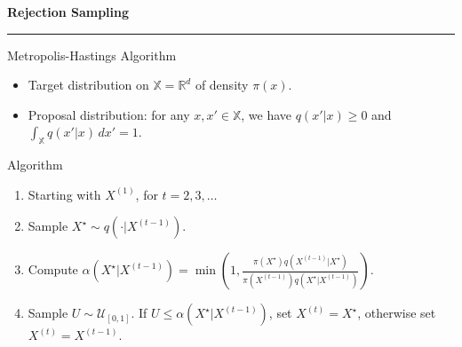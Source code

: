 
% 

\begin{frame}
	\vspace{2cm}
	\begin{center}
		{\Huge\textbf{\textcolor{copenhagenred}{Rejection Sampling}}}
		\vspace{1cm}

		\rule{4cm}{3pt}
		\vspace{2cm}
	\end{center}
\end{frame}


\begin{frame}{Metropolis-Hastings Algorithm}
	\begin{itemize}
		\item Target distribution on $\mathbb{X} = \mathbb{R}^d$ of density $\pi(x)$.
		\item Proposal distribution: for any $x, x' \in \mathbb{X}$, we have $q(x'|x) \geq 0$ and $\int_{\mathbb{X}} q(x'|x) \, dx' = 1$.


	\end{itemize}
	\begin{block}{Algorithm}
		\begin{enumerate}
			\item Starting with $X^{(1)}$, for $t = 2, 3, \ldots$
			\item Sample $X^{\star} \sim q(\cdot | X^{(t-1)})$.
			\item Compute $\alpha(X^{\star} | X^{(t-1)}) = \min\left(1, \frac{\pi(X^{\star}) q(X^{(t-1)} | X^{\star})}{\pi(X^{(t-1)}) q(X^{\star} | X^{(t-1)})}\right).$
			\item Sample $U \sim \mathcal{U}_{[0,1]}$. If $U \leq \alpha(X^{\star} | X^{(t-1)})$, set $X^{(t)} = X^{\star}$, otherwise set $X^{(t)} = X^{(t-1)}$.
		\end{enumerate}
	\end{block}
\end{frame}

